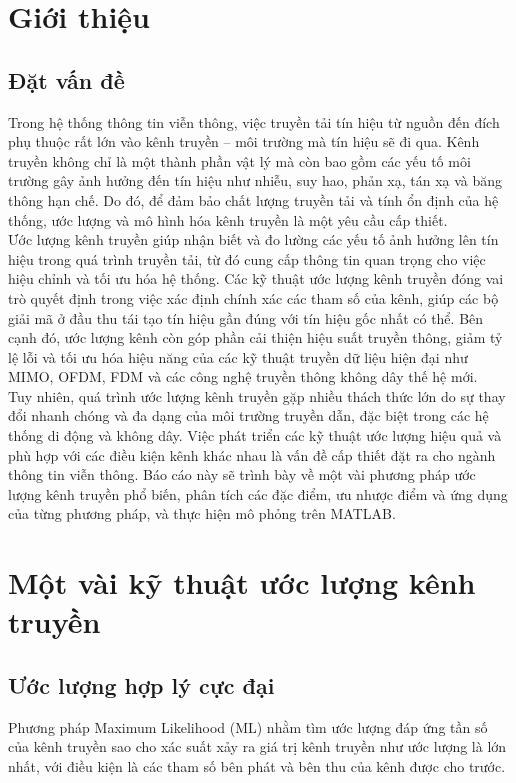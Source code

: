 \documentclass{article}
\begin{document}
\section{Giới thiệu}
\subsection{Đặt vấn đề}
Trong hệ thống thông tin viễn thông, việc truyền tải tín hiệu từ nguồn đến đích phụ thuộc rất lớn vào kênh truyền – môi trường mà tín hiệu sẽ đi qua. Kênh truyền không chỉ là một thành phần vật lý mà còn bao gồm các yếu tố môi trường gây ảnh hưởng đến tín hiệu như nhiễu, suy hao, phản xạ, tán xạ và băng thông hạn chế. Do đó, để đảm bảo chất lượng truyền tải và tính ổn định của hệ thống, ước lượng và mô hình hóa kênh truyền là một yêu cầu cấp thiết.\\

Ước lượng kênh truyền giúp nhận biết và đo lường các yếu tố ảnh hưởng lên tín hiệu trong quá trình truyền tải, từ đó cung cấp thông tin quan trọng cho việc hiệu chỉnh và tối ưu hóa hệ thống. Các kỹ thuật ước lượng kênh truyền đóng vai trò quyết định trong việc xác định chính xác các tham số của kênh, giúp các bộ giải mã ở đầu thu tái tạo tín hiệu gần đúng với tín hiệu gốc nhất có thể. Bên cạnh đó, ước lượng kênh còn góp phần cải thiện hiệu suất truyền thông, giảm tỷ lệ lỗi và tối ưu hóa hiệu năng của các kỹ thuật truyền dữ liệu hiện đại như MIMO, OFDM, FDM và các công nghệ truyền thông không dây thế hệ mới.\\

Tuy nhiên, quá trình ước lượng kênh truyền gặp nhiều thách thức lớn do sự thay đổi nhanh chóng và đa dạng của môi trường truyền dẫn, đặc biệt trong các hệ thống di động và không dây. Việc phát triển các kỹ thuật ước lượng hiệu quả và phù hợp với các điều kiện kênh khác nhau là vấn đề cấp thiết đặt ra cho ngành thông tin viễn thông. Báo cáo này sẽ trình bày về một vài phương pháp ước lượng kênh truyền phổ biến, phân tích các đặc điểm, ưu nhược điểm và ứng dụng của từng phương pháp, và thực hiện mô phỏng trên MATLAB.

\section{Một vài kỹ thuật ước lượng kênh truyền}
\subsection{Ước lượng hợp lý cực đại}
Phương pháp Maximum Likelihood (ML) nhằm tìm ước lượng đáp ứng tần số của kênh truyền sao cho xác suất xảy ra giá trị kênh truyền như ước lượng là lớn nhất, với điều kiện là các tham số bên phát và bên thu của kênh được cho trước.\\
\end{document}
